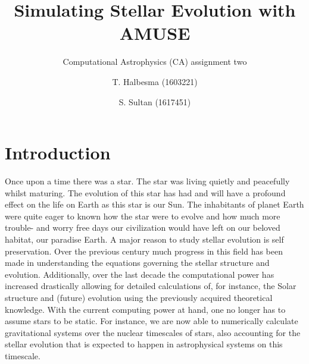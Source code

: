 \documentclass{aa}
\begin{document}
   \title{Simulating Stellar Evolution with AMUSE}

   \subtitle{Computational Astrophysics (CA) assignment two}

   \author{T. Halbesma (1603221)
          \and
          S. Sultan (1617451)
          }




  \abstract
   {}
   {}
   {}
   {}
   {}


   \maketitle
%

\section{Introduction}
Once upon a time there was a star. The star was living quietly and peacefully whilst maturing. The evolution of this star has had and will have a profound effect on the life on Earth as this star is our Sun. The inhabitants of planet Earth were quite eager to known how the star were to evolve and how much more trouble- and worry free days our civilization would have left on our beloved habitat, our paradise Earth. A major reason to study stellar evolution is self preservation. Over the previous century much progress in this field has been made in understanding the equations governing the stellar structure and evolution. Additionally, over the last decade the computational power has increased drastically allowing for detailed calculations of, for instance, the Solar structure and (future) evolution using the previously acquired theoretical knowledge. With the current computing power at hand, one no longer has to assume stars to be static. For instance, we are now able to numerically calculate gravitational systems over the nuclear timescales of stars, also accounting for the stellar evolution that is expected to happen in astrophysical systems on this timescale.
\end{document}
